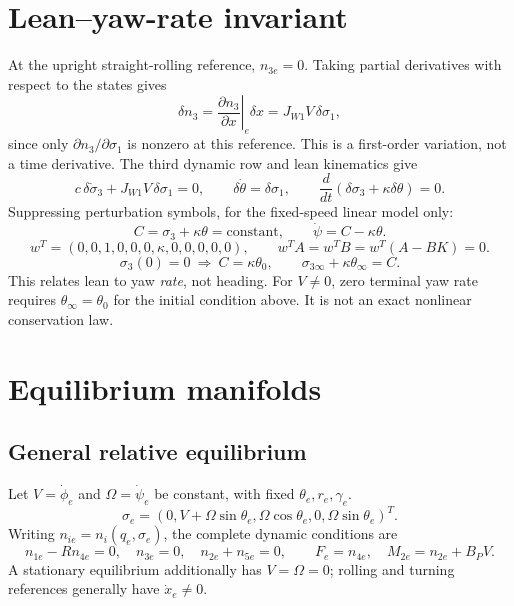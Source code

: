 \documentclass[10pt]{article}
\numberwithin{equation}{section}
\begin{document}
\section{Lean--yaw-rate invariant}
At the upright straight-rolling reference, $n_{3e}=0$. Taking partial
 derivatives with respect to the states gives
\begin{equation}
\delta n_3=\left.\frac{\partial n_3}{\partial x}\right|_e\delta x
=J_{W1}V\,\delta\sigma_1,
\end{equation}
since only $\partial n_3/\partial\sigma_1$ is nonzero at this reference.
This is a first-order variation, not a time derivative. The third dynamic
row and lean kinematics give
\begin{equation}
c\,\delta\dot\sigma_3+J_{W1}V\,\delta\sigma_1=0,\qquad
\delta\dot\theta=\delta\sigma_1,\qquad
\frac{d}{dt}(\delta\sigma_3+\kappa\delta\theta)=0.
\end{equation}
Suppressing perturbation symbols, for the fixed-speed linear model only:
\begin{equation}
\boxed{C=\sigma_3+\kappa\theta=\text{constant},\qquad
\dot\psi=C-\kappa\theta.}
\end{equation}
\begin{equation}
w^T=(0,0,1,0,0,0,\kappa,0,0,0,0,0),\qquad
w^TA=w^TB=w^T(A-BK)=0.
\end{equation}
\begin{equation}
\sigma_3(0)=0\ \Longrightarrow\ C=\kappa\theta_0,\qquad
\sigma_{3\infty}+\kappa\theta_\infty=C.
\end{equation}
This relates lean to yaw \emph{rate}, not heading. For $V\ne0$, zero terminal yaw rate requires
$\theta_\infty=\theta_0$ for the initial condition above. It is not an exact nonlinear conservation law.

\section{Equilibrium manifolds}
\subsection*{General relative equilibrium}
Let $V=\dot\phi_e$ and $\Omega=\dot\psi_e$ be constant, with fixed $\theta_e,r_e,\gamma_e$.
\begin{equation}
\sigma_e=(0,V+\Omega\sin\theta_e,\Omega\cos\theta_e,0,\Omega\sin\theta_e)^T.
\end{equation}
Writing $n_{ie}=n_i(q_e,\sigma_e)$, the complete dynamic conditions are
\begin{equation}
\boxed{n_{1e}-Rn_{4e}=0,\quad n_{3e}=0,\quad n_{2e}+n_{5e}=0,\qquad
F_e=n_{4e},\quad M_{2e}=n_{2e}+B_PV.}
\end{equation}
A stationary equilibrium additionally has $V=\Omega=0$; rolling and turning references generally have $\dot x_e\ne0$.
\end{document}
